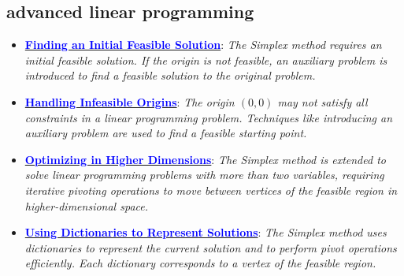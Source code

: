 \documentclass{article}%
\begin{document}
\begin{itemize}[leftmargin=*]
\subsection{advanced linear programming}%
\label{subsec:advancedlinearprogramming}%
\begin{itemize}[leftmargin=*]%
\item \href{https://www.math.purdue.edu/~yipn/421/2024-08-27-ExSimplex.pdf#page=32}{\textbf{\textcolor{blue}{Finding an Initial Feasible Solution}}}: \emph{The Simplex method requires an initial feasible solution. If the origin is not feasible, an auxiliary problem is introduced to find a feasible solution to the original problem.}%
\item \href{https://www.math.purdue.edu/~yipn/421/2024-08-27-ExSimplex.pdf#page=30}{\textbf{\textcolor{blue}{Handling Infeasible Origins}}}: \emph{The origin $(0, 0)$ may not satisfy all constraints in a linear programming problem. Techniques like introducing an auxiliary problem are used to find a feasible starting point.}%
\item \href{https://www.math.purdue.edu/~yipn/421/2024-08-27-ExSimplex.pdf#page=17}{\textbf{\textcolor{blue}{Optimizing in Higher Dimensions}}}: \emph{The Simplex method is extended to solve linear programming problems with more than two variables, requiring iterative pivoting operations to move between vertices of the feasible region in higher-dimensional space.}%
\item \href{https://www.math.purdue.edu/~yipn/421/2024-08-27-ExSimplex.pdf#page=26}{\textbf{\textcolor{blue}{Using Dictionaries to Represent Solutions}}}: \emph{The Simplex method uses dictionaries to represent the current solution and to perform pivot operations efficiently. Each dictionary corresponds to a vertex of the feasible region.}%
\end{itemize}

%
\end{itemize}%
\newpage

%
\end{document}
